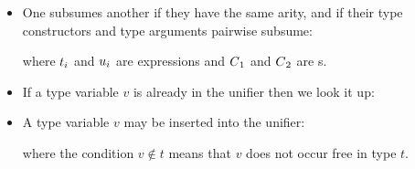 \begin{itemize}
\item One  subsumes another if they have the same arity, and if their type constructors and type arguments pairwise subsume:
\begin{prooftree}
\end{prooftree}
where $t\subi$ and $u\subi$ are  expressions  and $C\sub1$ and $C\sub2$ are s.

\item If a type variable $v$ is already in the unifier then we look it up:
\begin{prooftree}
\end{prooftree}

\begin{prooftree}
\end{prooftree}

\item A type variable $v$ may be inserted into the unifier:
\begin{prooftree}
\end{prooftree}
where the condition \ensuremath{v\notin{}t} means that $v$ does not occur free in type $t$.
\begin{prooftree}
\end{prooftree}

\end{itemize}

